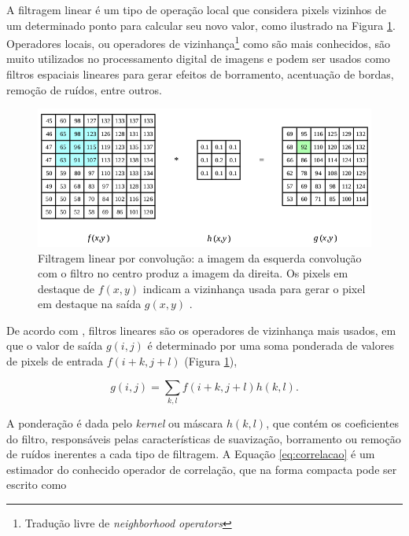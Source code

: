 A filtragem linear é um tipo de operação local que considera pixels vizinhos de um determinado ponto para calcular seu novo valor, como ilustrado na Figura \ref{fig:convolucao}. Operadores locais, ou operadores de vizinhança\footnote{Tradução livre de \textit{neighborhood operators}} como são mais conhecidos, são muito utilizados no processamento digital de imagens e podem ser usados como filtros espaciais lineares para gerar efeitos de borramento, acentuação de bordas, remoção de ruídos, entre outros.

\begin{figure}[ht]
  \begin{center}
    \includegraphics[scale=.58]{imgs/img_convolucao.png}
  \end{center}
  \caption{Filtragem linear por convolução: a imagem da esquerda convolução com o filtro no centro produz a imagem da direita. Os pixels em destaque de $f(x,y)$ indicam a vizinhança usada para gerar o pixel em destaque na saída $g(x,y)$ \citep{szeliski:2010:book}.}
  \label{fig:convolucao}
\end{figure}

De acordo com \cite{szeliski:2010:book}, filtros lineares são os operadores de vizinhança mais usados, em que o valor de saída $g(i,j)$ é determinado por uma soma ponderada de valores de pixels de entrada $f(i+k,j+l)$ (Figura \ref{fig:convolucao}),

\begin{equation}
  \label{eq:correlacao}
  g(i,j)=\sum_{k,l}f(i+k,j+l)h(k,l)\text{.}
\end{equation}

\noindent A ponderação é dada pelo \textit{kernel} ou máscara $h(k,l)$, que contém os coeficientes do filtro, responsáveis pelas características de suavização, borramento ou remoção de ruídos inerentes a cada tipo de filtragem. A Equação \eqref{eq:correlacao} é um estimador do conhecido operador de correlação, que na forma compacta pode ser escrito como

